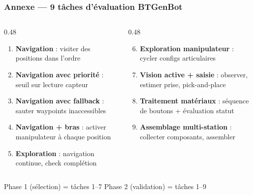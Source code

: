 \documentclass[aspectratio=169]{beamer}
\begin{document}
\begin{frame}
  \frametitle{Annexe — 9 tâches d'évaluation BTGenBot}

  \begin{columns}
    \begin{column}{0.48\textwidth}
      \begin{enumerate}
        \item \textbf{Navigation} : visiter des positions dans l'ordre
        \item \textbf{Navigation avec priorité} : seuil sur lecture capteur
        \item \textbf{Navigation avec fallback} : sauter waypoints inaccessibles
        \item \textbf{Navigation + bras} : activer manipulateur à chaque position
        \item \textbf{Exploration} : navigation continue, check complétion
      \end{enumerate}
    \end{column}
    \begin{column}{0.48\textwidth}
      \begin{enumerate}
        \setcounter{enumi}{5}
        \item \textbf{Exploration manipulateur} : cycler configs articulaires
        \item \textbf{Vision active + saisie} : observer, estimer prise, pick-and-place
        \item \textbf{Traitement matériaux} : séquence de boutons + évaluation statut
        \item \textbf{Assemblage multi-station} : collecter composants, assembler
      \end{enumerate}
    \end{column}
  \end{columns}

  \vspace{0.5em}
  \small Phase 1 (sélection) = tâches 1–7 \quad Phase 2 (validation) = tâches 1–9
\end{frame}
\end{document}
